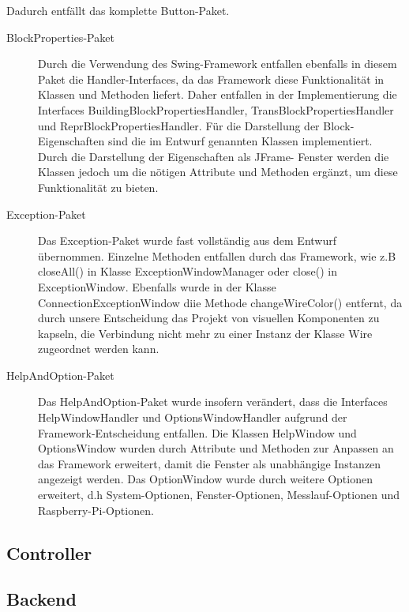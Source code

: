 \documentclass[parskip=full]{scrartcl}
\begin{document}
Dadurch entfällt das komplette Button-Paket.

\begin{description}
\item[BlockProperties-Paket]

Durch die Verwendung des Swing-Framework entfallen ebenfalls in diesem Paket die Handler-Interfaces, da das Framework diese Funktionalität in Klassen und Methoden liefert. Daher entfallen in der Implementierung die Interfaces BuildingBlockPropertiesHandler, TransBlockPropertiesHandler und ReprBlockPropertiesHandler.
Für die Darstellung der Block-Eigenschaften sind die im Entwurf genannten Klassen implementiert. Durch die Darstellung der Eigenschaften als JFrame- Fenster werden die Klassen jedoch um die nötigen Attribute und Methoden ergänzt, um diese Funktionalität zu bieten.

\item[Exception-Paket]

Das Exception-Paket wurde fast vollständig aus dem Entwurf übernommen. Einzelne Methoden entfallen durch das Framework, wie z.B closeAll() in Klasse ExceptionWindowManager oder close() in ExceptionWindow. 
Ebenfalls wurde in der Klasse ConnectionExceptionWindow diie Methode changeWireColor() entfernt, da durch unsere Entscheidung das Projekt von visuellen Komponenten zu kapseln, die Verbindung nicht mehr zu einer Instanz der Klasse Wire zugeordnet werden kann.

\item[HelpAndOption-Paket]

Das HelpAndOption-Paket wurde insofern verändert, dass die Interfaces HelpWindowHandler und OptionsWindowHandler aufgrund der Framework-Entscheidung entfallen.
Die Klassen HelpWindow und OptionsWindow wurden durch Attribute und Methoden zur Anpassen an das Framework erweitert, damit die Fenster als unabhängige Instanzen angezeigt werden. Das OptionWindow wurde durch weitere Optionen erweitert, d.h System-Optionen, Fenster-Optionen, Messlauf-Optionen und Raspberry-Pi-Optionen.
\end{description}

\subsection{Controller}

\subsection{Backend}
\end{document}
